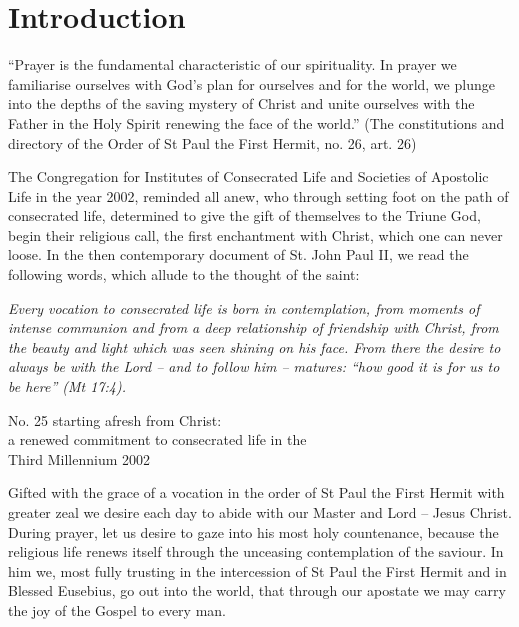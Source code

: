 
\section*{Introduction} 

\setlength{\parskip}{1em}

{``Prayer is the fundamental characteristic of our spirituality. In prayer we familiarise ourselves with God's plan for ourselves and for the world, we plunge into the depths of the saving mystery of Christ and unite ourselves with the Father in the Holy Spirit renewing the face of the world.'' (The constitutions and directory of the Order of St Paul the First Hermit, no. 26, art. 26)\par}

{The Congregation for Institutes of Consecrated Life and Societies of Apostolic Life in the year 2002, reminded all anew, who through setting foot on the path of consecrated life, determined to give the gift of themselves to the Triune God, begin their religious call, the first enchantment with Christ, which one can never loose. In the then contemporary document of St. John Paul II, we read the following words, which allude to the thought of the saint:\par}

\begin{addmargin}[2em]{2em}
\textit{Every vocation to consecrated life is born in contemplation, from moments of intense communion and from a deep relationship of friendship with Christ, from the beauty and light which was seen shining on his face. From there the desire to always be with the Lord -- and to follow him -- matures: ``how good it is for us to be here'' (Mt 17:4).}
\end{addmargin}

\begin{flushright}
No. 25 starting afresh from Christ: \\ a renewed commitment to consecrated life in the  \\ Third Millennium 2002
\end{flushright}


{Gifted with the grace of a vocation in the order of St Paul the First Hermit with greater zeal we desire each day to abide with our Master and Lord -- Jesus Christ. During prayer, let us desire to gaze into his most holy countenance, because the religious life renews itself through the unceasing contemplation of the saviour. In him we, most fully trusting in the intercession of St Paul the First Hermit and in Blessed Eusebius, go out into the world, that through our apostate we may carry the joy of the Gospel to every man.\par}


